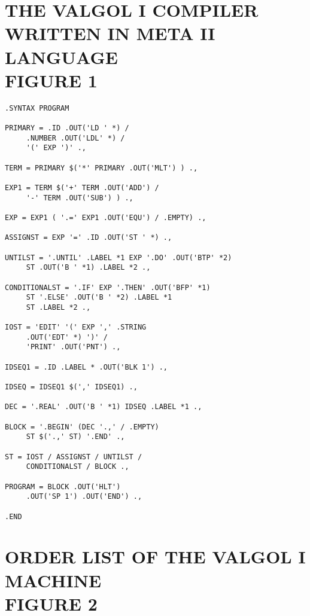 \documentclass[twocolumn]{article}
\begin{document}
\pagebreak

\section{THE VALGOL I COMPILER WRITTEN IN META II LANGUAGE\\FIGURE 1}
\begin{verbatim}
.SYNTAX PROGRAM

PRIMARY = .ID .OUT('LD ' *) /
     .NUMBER .OUT('LDL' *) /
     '(' EXP ')' .,

TERM = PRIMARY $('*' PRIMARY .OUT('MLT') ) .,

EXP1 = TERM $('+' TERM .OUT('ADD') /
     '-' TERM .OUT('SUB') ) .,

EXP = EXP1 ( '.=' EXP1 .OUT('EQU') / .EMPTY) .,

ASSIGNST = EXP '=' .ID .OUT('ST ' *) .,

UNTILST = '.UNTIL' .LABEL *1 EXP '.DO' .OUT('BTP' *2)
     ST .OUT('B ' *1) .LABEL *2 .,

CONDITIONALST = '.IF' EXP '.THEN' .OUT('BFP' *1)
     ST '.ELSE' .OUT('B ' *2) .LABEL *1
     ST .LABEL *2 .,

IOST = 'EDIT' '(' EXP ',' .STRING
     .OUT('EDT' *) ')' /
     'PRINT' .OUT('PNT') .,

IDSEQ1 = .ID .LABEL * .OUT('BLK 1') .,

IDSEQ = IDSEQ1 $(',' IDSEQ1) .,

DEC = '.REAL' .OUT('B ' *1) IDSEQ .LABEL *1 .,

BLOCK = '.BEGIN' (DEC '.,' / .EMPTY)
     ST $('.,' ST) '.END' .,

ST = IOST / ASSIGNST / UNTILST /
     CONDITIONALST / BLOCK .,

PROGRAM = BLOCK .OUT('HLT')
     .OUT('SP 1') .OUT('END') .,

.END
\end{verbatim}


\section{ORDER LIST OF THE VALGOL I MACHINE\\FIGURE 2}
\end{document}
